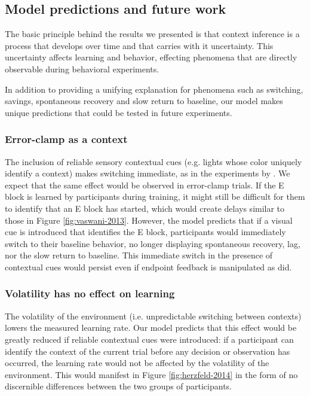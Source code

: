 \documentclass[a4paper,doc,floatsintext,natbib]{apa6}
\def \fref #1{Figure \ref{#1}}     %
\begin{document}
\subsection{Model predictions and future work}
The basic principle behind the results we presented is that context inference is a process that develops over time and that carries with it uncertainty. This uncertainty affects learning and behavior, effecting phenomena that are directly observable during behavioral experiments.

In addition to providing a unifying explanation for phenomena such as switching, savings, spontaneous recovery and slow return to baseline, our model makes unique predictions that could be tested in future experiments.

\subsubsection{Error-clamp as a context}
The inclusion of reliable sensory contextual cues (e.g. lights whose color uniquely identify a context) makes switching immediate, as in the experiments by \cite{Kim_Neural_2015}. We expect that the same effect would be observed in error-clamp trials. If the E block is learned by participants during training, it might still be difficult for them to identify that an E block has started, which would create delays similar to those in \fref{fig:vaswani-2013}. However, the model predicts that if a visual cue is introduced that identifies the E block, participants would immediately switch to their baseline behavior, no longer displaying spontaneous recovery, lag, nor the slow return to baseline. This immediate switch in the presence of contextual cues would persist even if endpoint feedback is manipulated as \cite{Vaswani_Decay_2013} did.

\subsubsection{Volatility has no effect on learning}
The volatility of the environment (i.e. unpredictable switching between contexts) lowers the measured learning rate. Our model predicts that this effect would be greatly reduced if reliable contextual cues were introduced: if a participant can identify the context of the current trial before any decision or observation has occurred, the learning rate would not be affected by the volatility of the environment. This would manifest in \fref{fig:herzfeld-2014} in the form of no discernible differences between the two groups of participants.
\end{document}
